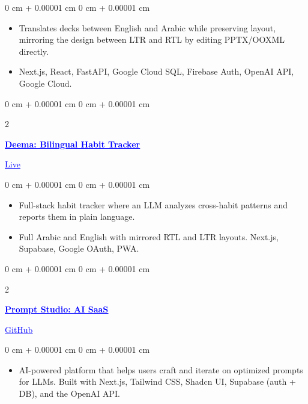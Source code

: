 \documentclass[10pt, letterpaper]{article}
\newenvironment{highlights}{
    \begin{itemize}[
        topsep=0.05 cm,
        parsep=0.05 cm,
        partopsep=0pt,
        itemsep=0pt,
        leftmargin=0 cm + 10pt
    ]
}{
    \end{itemize}
}
\newenvironment{onecolentry}{
    \begin{adjustwidth}{
        0 cm + 0.00001 cm
    }{
        0 cm + 0.00001 cm
    }
}{
    \end{adjustwidth}
}
\newenvironment{twocolentry}[2][]{
    \onecolentry
    \def\secondColumn{#2}
    \setcolumnwidth{\fill, 4.5 cm}
    \begin{paracol}{2}
}{
    \switchcolumn \raggedleft \secondColumn
    \end{paracol}
    \endonecolentry
}
\begin{document}
    \vspace{0.06 cm}
    \begin{onecolentry}
        \begin{highlights}
            \item Translates decks between English and Arabic while preserving layout, mirroring the design between LTR and RTL by editing PPTX/OOXML directly.
            \item Next.js, React, FastAPI, Google Cloud SQL, Firebase Auth, OpenAI API, Google Cloud.
        \end{highlights}
    \end{onecolentry}

    \vspace{0.08 cm}

    \begin{twocolentry}{
        2026 \hspace{0.5cm} \href{https://deema.khal1dx.com}{\textcolor{blue}{\underline{Live}}}
    }
        \textbf{\href{https://deema.khal1dx.com}{\textcolor{blue}{\underline{Deema: Bilingual Habit Tracker}}}}
    \end{twocolentry}

    \vspace{0.06 cm}
    \begin{onecolentry}
        \begin{highlights}
            \item Full-stack habit tracker where an LLM analyzes cross-habit patterns and reports them in plain language.
            \item Full Arabic and English with mirrored RTL and LTR layouts. Next.js, Supabase, Google OAuth, PWA.
        \end{highlights}
    \end{onecolentry}

    \vspace{0.08 cm}

    \begin{twocolentry}{
        2025 \hspace{0.5cm} \href{https://github.com/kha1dx/Clara/tree/main}{\textcolor{blue}{\underline{GitHub}}}
    }
        \textbf{\href{https://clarityai.khal1dx.com}{\textcolor{blue}{\underline{Prompt Studio: AI SaaS}}}}
    \end{twocolentry}

    \vspace{0.06 cm}
    \begin{onecolentry}
        \begin{highlights}
            \item AI-powered platform that helps users craft and iterate on optimized prompts for LLMs. Built with Next.js, Tailwind CSS, Shadcn UI, Supabase (auth + DB), and the OpenAI API.
        \end{highlights}
    \end{onecolentry}
\end{document}
